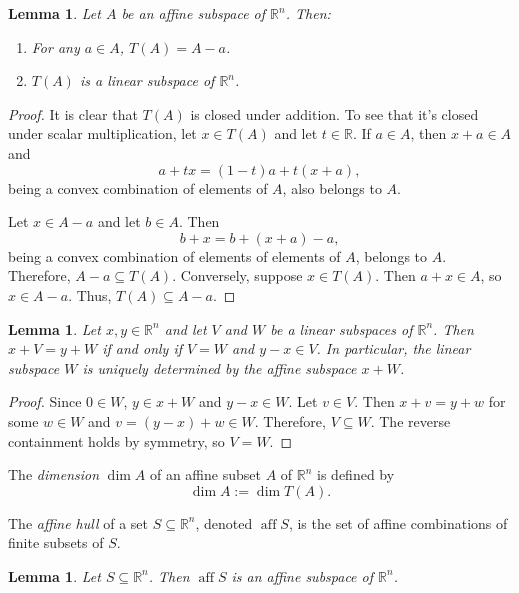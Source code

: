 \documentclass[12pt]{amsart}
\newtheorem{lemma}[theorem]{Lemma}
\theoremstyle{definition}
\theoremstyle{remark}
\numberwithin{equation}{section}
\newcommand{\RR}{\mathbb{R}}
\DeclareMathOperator{\aff}{aff}
\begin{document}
\begin{lemma}
    Let $A$ be an affine subspace of $\RR^n$. Then:
    \begin{enumerate}
        \item For any $a\in A$, $T(A) = A - a$.
        \item $T(A)$ is a linear subspace of $\RR^n$.
    \end{enumerate}
\end{lemma}

\begin{proof}
    It is clear that $T(A)$ is closed under addition.
    To see that it's closed under scalar multiplication,
    let $x\in T(A)$ and let $t\in\RR$.
    If $a\in A$, then $x + a\in A$ and
    \[
        a + tx = (1 - t)a + t(x + a),
    \]
    being a convex combination of elements of $A$, also belongs to $A$.

    Let $x\in A - a$ and let $b\in A$.
    Then
    \[
        b + x = b + (x + a) - a,
    \]
    being a convex combination of elements of elements of $A$,
    belongs to $A$.
    Therefore, $A - a\subseteq T(A)$.
    Conversely, suppose $x\in T(A)$.
    Then $a + x\in A$, so $x\in A - a$.
    Thus, $T(A)\subseteq A - a$.
\end{proof}

\begin{lemma}
    Let $x,y\in\RR^n$ and let $V$ and $W$ be a linear subspaces of $\RR^n$.
    Then $x+V = y + W$ if and only if $V=W$ and $y-x\in V$.
    In particular, the linear subspace $W$ is uniquely determined by the
    affine subspace $x+W$.
\end{lemma}

\begin{proof}
    Since $0\in W$, $y\in x+W$ and $y-x\in W$.
    Let $v\in V$.
    Then $x+v=y+w$ for some $w\in W$ and $v = (y-x) + w\in W$.
    Therefore, $V\subseteq W$.
    The reverse containment holds by symmetry, so $V=W$.
\end{proof}

The \emph{dimension} $\dim A$ of an affine subset $A$ of $\RR^n$
is defined by
\[
    \dim A := \dim T(A).
\]

The \emph{affine hull} of a set $S\subseteq\RR^n$, denoted $\aff S$, is the set of
affine combinations of finite subsets of $S$.

\begin{lemma}
    Let $S\subseteq\RR^n$.
    Then $\aff S$ is an affine subspace of $\RR^n$.
\end{lemma}
\end{document}
